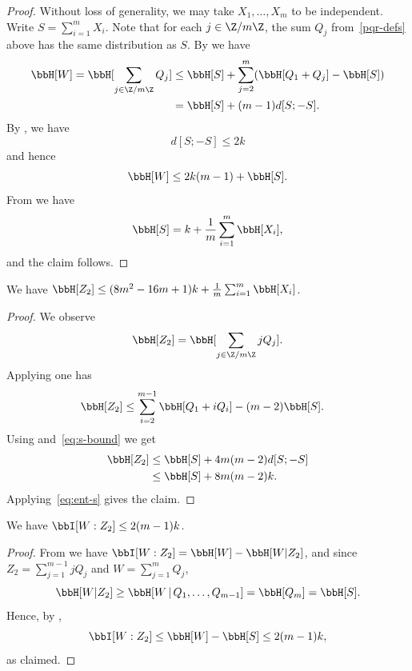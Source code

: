 \begin{proof}\leanok Without loss of generality, we may take $X_1,\dots,X_m$ to be independent. Write $S = \sum_{i=1}^m X_i$.
  Note that for each $j \in \Z/m\Z$, the sum $Q_j$ from~\eqref{pqr-defs} above has the same distribution as $S$.
  By  we have
  \begin{align*}
    \bbH[W] = \bbH[\sum_{j \in \Z/m\Z} Q_j]  & \leq \bbH[S] + \sum_{j=2}^m (\bbH[Q_1+Q_j] - \bbH[S]) \\ & = \bbH[S] + (m-1) d[S;-S].
  \end{align*}
  By , we have
  \begin{equation}
    \label{eq:s-bound}
    d[S; -S] \leq 2 k
  \end{equation}
  and hence
  \[
    \bbH[W] \leq 2 k (m-1) + \bbH[S].
  \]
  From  we have
  \begin{equation}
    \label{eq:ent-s}
    \bbH[S] = k + \frac1m \sum_{i=1}^m \bbH[X_i],
  \end{equation}
  and the claim follows.
\end{proof}

\begin{lemma}[Entropy of $Z_2$]\label{ent-z2}\leanok  We have $\bbH[Z_2] \leq (8m^2-16m+1) k + \frac{1}{m} \sum_{i=1}^m \bbH[X_i]$.
\end{lemma}

\begin{proof}\leanok
  We observe
  \[
    \bbH[Z_2] = \bbH[\sum_{j \in \Z/m\Z} j Q_j].
  \]
  Applying  one has
  \begin{align*}
    \bbH[Z_2] &\leq \sum_{i=2}^{m-1} \bbH[Q_1 + i Q_i]  - (m-2) \bbH[S].
  \end{align*}
  Using  and~\eqref{eq:s-bound} we get
  \begin{align*}
    \bbH[Z_2]
              &\leq \bbH[S] + 4m (m-2) d[S;-S] \\
              &\leq \bbH[S] + 8m (m-2) k.
  \end{align*}
  Applying~\eqref{eq:ent-s} gives the claim.
\end{proof}

\begin{lemma}\label{mutual-w-z2}\leanok  We have  $\bbI[W : Z_2] \leq 2 (m-1) k$.
\end{lemma}

\begin{proof}\leanok
  From  we have $\bbI[W : Z_2] = \bbH[W] - \bbH[W | Z_2]$, and since $Z_2 = \sum_{j=1}^{m-1} j Q_j$ and $W = \sum_{j=1}^m Q_j$,
  \[
    \bbH[W | Z_2] \geq \bbH[W \,|\, Q_1,\dots,Q_{m-1}] = \bbH[Q_m] = \bbH[S].
  \]
  Hence, by ,
  \[
    \bbI[W : Z_2] \leq \bbH[W] - \bbH[S] \leq 2 (m-1) k,
  \]
  as claimed.
\end{proof}

